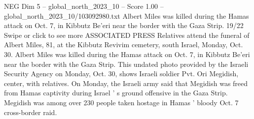 \begin{textsample}{NEG Dim 5 – global\_north\_2023\_10 – Score 1.00 – global\_north\_2023\_10/103092980.txt}
Albert Miles was killed during the Hamas attack on Oct. 7, in Kibbutz Be'eri near the border with the Gaza Strip. 19/22 Swipe or click to see more ASSOCIATED PRESS Relatives attend the funeral of Albert Miles, 81, at the Kibbutz Revivim cemetery, south Israel, Monday, Oct. 30.
Albert Miles was killed during the Hamas attack on Oct. 7, in Kibbutz Be'eri near the border with the Gaza Strip.
This undated photo provided by the Israeli Security Agency on Monday, Oct. 30, shows Israeli soldier Pvt.
Ori Megidish, center, with relatives.
On Monday, the Israeli army said that Megidish was freed from Hamas captivity during Israel ' s ground offensive in the Gaza Strip.
Megidish was among over 230 people taken hostage in Hamas ' bloody Oct. 7 cross-border raid.

\end{textsample}
